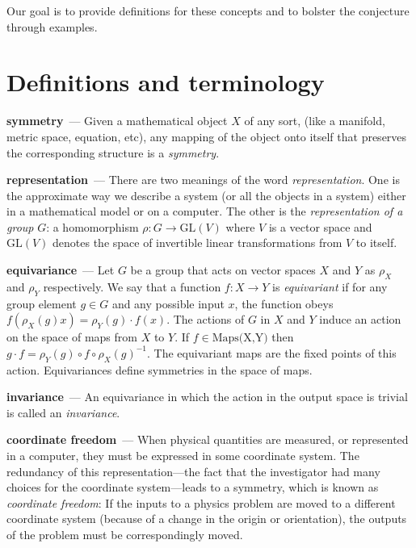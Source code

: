 \documentclass[11pt]{article}
\renewcommand{\paragraph}[1]{\medskip\par\noindent\textbf{#1}~---}
\begin{document}
Our goal is to provide definitions for these concepts and to bolster the conjecture through examples.

\section{Definitions and terminology}

\paragraph{symmetry}
Given a mathematical object $X$ of any sort, (like a manifold, metric space, equation, etc), any mapping of the object onto itself that preserves the corresponding structure is a \emph{symmetry}.

\paragraph{representation}
There are two meanings of the word \emph{representation}. One is the approximate way we describe a system (or all the objects in a system) either in a mathematical model or on a computer.
The other is the \emph{representation of a group} $G$: a homomorphism $\rho: G\to \text{GL}(V)$ where $V$ is a vector space and $\text{GL}(V)$ denotes the space of invertible linear transformations from $V$ to itself.

\paragraph{equivariance}
Let $G$ be a group that acts on vector spaces $X$ and $Y$ as $\rho_X$ and $\rho_Y$ respectively. We say that a function $f:X\to Y$ is \emph{equivariant} if for any group element $g\in G$ and any possible input $x$, the function obeys $f( \rho_X(g) x) = \rho_Y(g)\cdot f(x)$.
The actions of $G$ in $X$ and $Y$ induce an action on the space of maps from $X$ to $Y$. If $f\in \text{Maps(X,Y)}$ then $g\cdot f = \rho_Y(g)\circ f \circ \rho_X(g)^{-1}$.
The equivariant maps are the fixed points of this action.
Equivariances define symmetries in the space of maps. 

\paragraph{invariance}
An equivariance in which the action in the output space is trivial is called an \emph{invariance}.

\paragraph{coordinate freedom}
When physical quantities are measured, or represented in a computer, they must be expressed in some coordinate system.
The redundancy of this representation---the fact that the investigator had many choices for the coordinate system---leads to a symmetry, which is known as \emph{coordinate freedom}:
If the inputs to a physics problem are moved to a different coordinate system (because of a change in the origin or orientation), the outputs of the problem must be correspondingly moved.
\end{document}
